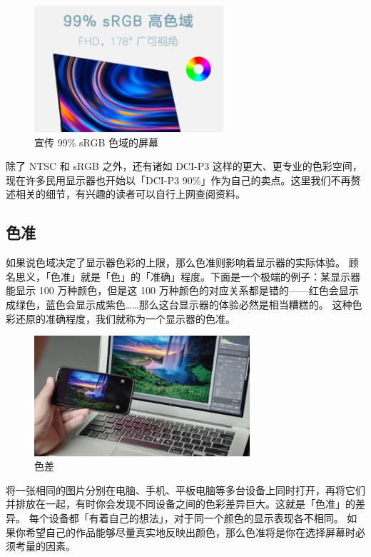 \begin{figure}[htb!]
  \centering
  \includegraphics[width=7cm]{assets/99_sRGB_Ad.png}
  \caption{宣传 99\% sRGB 色域的屏幕}
  \label{99_sRGB_Ad}
\end{figure}

除了 NTSC 和 sRGB 之外，还有诸如 DCI-P3 这样的更大、更专业的色彩空间，现在许多民用显示器也开始以「DCI-P3 90\%」作为自己的卖点。这里我们不再赘述相关的细节，有兴趣的读者可以自行上网查阅资料。

\subsection{色准}

如果说色域决定了显示器色彩的上限，那么色准则影响着显示器的实际体验。
顾名思义，「色准」就是「色」的「准确」程度。下面是一个极端的例子：某显示器能显示 100 万种颜色，但是这 100 万种颜色的对应关系都是错的——红色会显示成绿色，蓝色会显示成紫色……那么这台显示器的体验必然是相当糟糕的。
这种色彩还原的准确程度，我们就称为一个显示器的色准。

\begin{figure}[htb!]
  \centering
  \includegraphics[width=8cm]{assets/Off_Color.png}
  \caption{色差}
  \label{Off_Color}
\end{figure}

将一张相同的图片分别在电脑、手机、平板电脑等多台设备上同时打开，再将它们并排放在一起，有时你会发现不同设备之间的色彩差异巨大。这就是「色准」的差异。
每个设备都「有着自己的想法」，对于同一个颜色的显示表现各不相同。
如果你希望自己的作品能够尽量真实地反映出颜色，那么色准将是你在选择屏幕时必须考量的因素。

